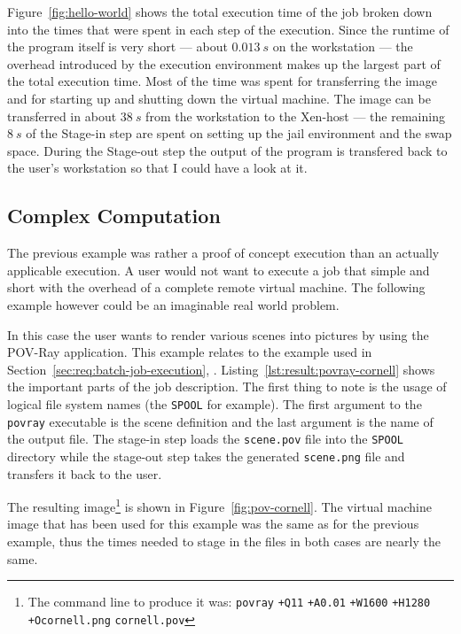 Figure~\ref{fig:hello-world}  shows the  total execution  time of  the job
broken  down  into  the  times  that  were  spent  in  each  step  of  the
execution. Since the runtime of the program itself is very short --- about
$0.013\ s$ on the workstation --- the overhead introduced by the execution
environment makes up the largest part of the total execution time. Most of
the time  was spent  for transferring  the image and  for starting  up and
shutting down the  virtual machine. The image can  be transferred in about
$38\ s$ from  the workstation to the Xen-host --- the  remaining $8\ s$ of
the Stage-in  step are spent  on setting up  the jail environment  and the
swap  space.  During the  Stage-out  step the  output  of  the program  is
transfered back to  the user's workstation so that I could  have a look at
it.

\subsection{Complex Computation}
\label{sec:complex-example}

The  previous example  was rather  a proof  of concept  execution  than an
actually applicable  execution. A  user would not  want to execute  a job
that  simple and  short with  the overhead  of a  complete  remote virtual
machine. The following  example however could be an  imaginable real world
problem.

In this  case the  user wants  to render various  scenes into  pictures by
using the POV-Ray \cite{POV-Ray}  application. This example relates to the
example       used      in      Section~\ref{sec:req:batch-job-execution},
. Listing~\ref{lst:result:povray-cornell}
shows the important parts of the job description.  The first thing to note
is  the  usage  of  logical  file system  names  (the  \texttt{SPOOL}  for
example).   The first argument  to the  \texttt{povray} executable  is the
scene definition  and the last  argument is the  name of the  output file.
The   stage-in   step  loads   the   \texttt{scene.pov}   file  into   the
\texttt{SPOOL}  directory while  the  stage-out step  takes the  generated
\texttt{scene.png} file and transfers it back to the user.

The  resulting   image\footnote{The  command  line  to   produce  it  was:
  \texttt{povray}     \texttt{+Q11}     \texttt{+A0.01}    \texttt{+W1600}
  \texttt{+H1280} \texttt{+Ocornell.png} \texttt{cornell.pov}} is shown in
Figure~\ref{fig:pov-cornell}.   The virtual  machine image  that  has been
used for this  example was the same as for the  previous example, thus the
times needed to stage in the files in both cases are nearly the same.


